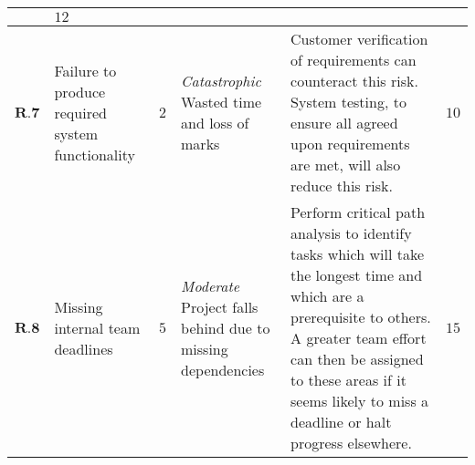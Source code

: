 \begin{longtable}[H]{| p{0.6cm} | p{2cm} | p{0.3cm} | p{2.6cm} | p{8.1cm} | p{0.7cm} |}
    & $12$    \\ \hline
    $ \textbf{R.7}  $   & Failure to produce required system functionality & $2$ & \textit{Catastrophic}
\newline Wasted time and loss of marks                        
    & Customer verification of requirements can counteract this risk. System testing, to ensure all agreed upon requirements are met, will also reduce this risk.                                                                                                                                                                                                                                                                                                                                                                                      
    & $10$    \\ \hline
   $ \textbf{R.8} $    & Missing internal team deadlines                  & $5$            & \textit{Moderate}
\newline Project falls behind due to missing dependencies                     
    & Perform critical path analysis to identify tasks which will take the longest time and which are a prerequisite to others. A greater team effort can then be assigned to these areas if it seems likely to miss a deadline or halt progress elsewhere.                                           
    &  $15$    \\ \hline
\end{longtable}
